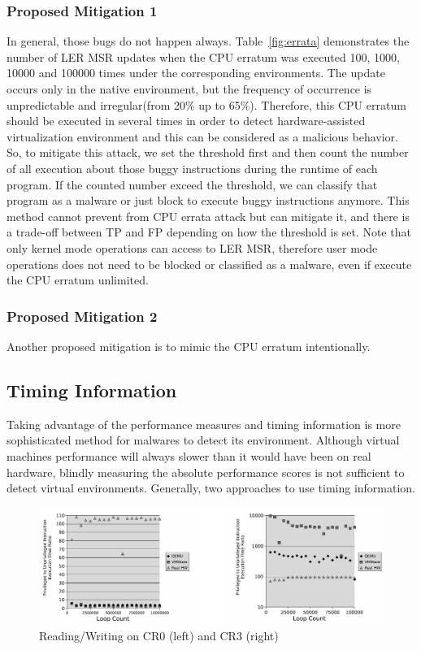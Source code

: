 \subsubsection{Proposed Mitigation 1}
In general, those bugs do not happen always. Table~\ref{fig:errata} demonstrates the number of LER MSR updates when the CPU erratum was executed 100, 1000, 10000 and 100000 times under the corresponding environments. The update occurs only in the native environment, but the frequency of occurrence is unpredictable and irregular(from 20\% up to 65\%). Therefore, this CPU erratum should be executed in several times in order to detect hardware-assisted virtualization environment and this can be considered as a malicious behavior. So, to mitigate this attack, we set the threshold first and then count the number of all execution about those buggy instructions during the runtime of each program. If the counted number exceed the threshold, we can classify that program as a malware or just block to execute buggy instructions anymore. This method cannot prevent from CPU errata attack but can mitigate it, and there is a trade-off between TP and FP depending on how the threshold is set. Note that only kernel mode operations can access to LER MSR, therefore user mode operations does not need to be blocked or classified as a malware, even if execute the CPU erratum unlimited.

\subsubsection{Proposed Mitigation 2}
Another proposed mitigation is to mimic the CPU erratum intentionally. 

\subsection{Timing Information}
\label{sec:approach-timing}
Taking advantage of the performance measures and timing information is more sophisticated method for malwares to detect its environment. Although virtual machine\textquotesingle s performance will always slower than it would have been on real hardware, blindly measuring the absolute performance scores is not sufficient to detect virtual environments.\cite{raffetseder2007} Generally, two approaches to use timing information.

\begin{figure}[!t]
	\centering
	\includegraphics[width=\textwidth]{figure/comp_inst.jpg}
	\caption{Reading/Writing on CR0 (left) and CR3 (right)}
	\label{fig:comparison_of_instructions}
\end{figure}

